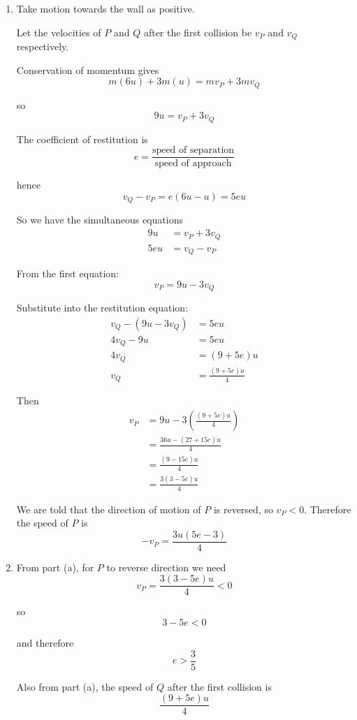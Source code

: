 \documentclass[leqno]{article}
\begin{document}
\begin{enumerate}[
  label=\textbf{\arabic*.},
  leftmargin=*,
  topsep=0pt,
  partopsep=0pt,
  parsep=0pt
]
\vspace*{10pt}

\begin{djsSolution}
\begin{enumerate}[label=\textbf{(\alph*)}]
  \item Take motion towards the wall as positive.

  Let the velocities of $P$ and $Q$ after the first collision be $v_P$ and $v_Q$ respectively.

  Conservation of momentum gives
  \[
  m(6u)+3m(u)=mv_P+3mv_Q
  \]

  so
  \[
  9u=v_P+3v_Q
  \]

  The coefficient of restitution is
  \[
  e=\frac{\text{speed of separation}}{\text{speed of approach}}
  \]

  hence
  \[
  v_Q-v_P=e(6u-u)=5eu
  \]

  So we have the simultaneous equations
  \begin{align*}
  9u&=v_P+3v_Q \\
  5eu&=v_Q-v_P
  \end{align*}

  From the first equation:
  \[
  v_P=9u-3v_Q
  \]

  Substitute into the restitution equation:
  \begin{align*}
  v_Q-(9u-3v_Q)&=5eu \\
  4v_Q-9u&=5eu \\
  4v_Q&=(9+5e)u \\
  v_Q&=\frac{(9+5e)u}{4}
  \end{align*}

  Then
  \begin{align*}
  v_P&=9u-3\left(\frac{(9+5e)u}{4}\right) \\
     &=\frac{36u-(27+15e)u}{4} \\
     &=\frac{(9-15e)u}{4} \\
     &=\frac{3(3-5e)u}{4}
  \end{align*}

  We are told that the direction of motion of $P$ is reversed, so $v_P<0$. Therefore the speed of $P$ is
  \[
  -v_P=\frac{3u(5e-3)}{4}
  \]


  \item From part (a), for $P$ to reverse direction we need
  \[
  v_P=\frac{3(3-5e)u}{4}<0
  \]

  so
  \[
  3-5e<0
  \]

  and therefore
  \[
  e>\frac35
  \]

  Also from part (a), the speed of $Q$ after the first collision is
  \[
  \frac{(9+5e)u}{4}
  \]


\end{enumerate}
\end{djsSolution}
\end{enumerate}
\end{document}

